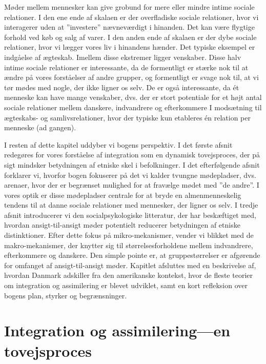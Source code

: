\documentclass[
]{book}
\begin{document}
Møder mellem mennesker kan give grobund for mere eller mindre intime sociale relationer. I den ene ende af skalaen er der overfladiske sociale relationer, hvor vi interagerer uden at ''investere'' nævneværdigt i hinanden. Det kan være flygtige forhold ved køb og salg af varer. I den anden ende af skalaen er der dybe sociale relationer, hvor vi lægger vores liv i hinandens hænder. Det typiske eksempel er indgåelse af ægteskab. Imellem disse ekstremer ligger venskaber. Disse halv intime sociale relationer er interessante, da de formentligt er stærke nok til at ændre på vores forståelser af andre grupper, og formentligt er svage nok til, at vi tør mødes med nogle, der ikke ligner os selv. De er også interessante, da ét menneske kan have mange venskaber, dvs. der er stort potentiale for et højt antal sociale relationer mellem danskere, indvandrere og efterkommere I modsætning til ægteskabs- og samlivsrelationer, hvor der typiske kun etableres én relation per menneske (ad gangen).

I resten af dette kapitel uddyber vi bogens perspektiv. I det første afsnit redegøres for vores forståelse af integration som en dynamisk tovejsproces, der på sigt mindsker betydningen af etniske skel i befolkninger. I det efterfølgende afsnit forklarer vi, hvorfor bogen fokuserer på det vi kalder tvungne mødepladser, dvs. arenaer, hvor der er begrænset mulighed for at fravælge mødet med ''de andre''. I vores optik er disse mødepladser centrale for at bryde en almenmenneskelig tendens til at danne sociale relationer med mennesker, der ligner os selv. I tredje afsnit introducerer vi den socialpsykologiske litteratur, der har beskæftiget med, hvordan ansigt-til-ansigt møder potentielt reducerer betydningen af etniske distinktioner. Efter dette fokus på mikro-mekanismer, vender vi blikket med de makro-mekanismer, der knytter sig til størrelsesforholdene mellem indvandrere, efterkommere og danskere. Den simple pointe er, at gruppestørrelser er afgørende for omfanget af ansigt-til-ansigt møder. Kapitlet afsluttes med en beskrivelse af, hvordan Danmark adskiller fra den amerikanske kontekst, hvor de fleste teorier om integration og assimilering er blevet udviklet, samt en kort refleksion over bogens plan, styrker og begrænsninger.

\section{Integration og assimilering---en tovejsproces}\label{integration-og-assimileringen-tovejsproces}
\end{document}
